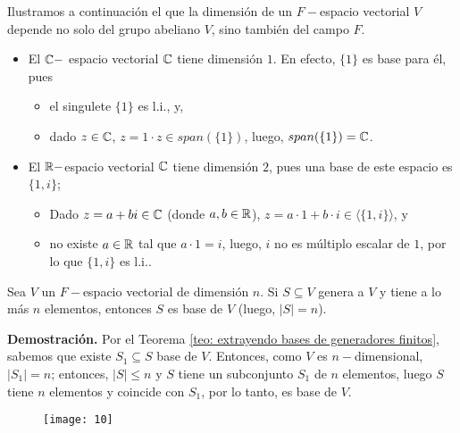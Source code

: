 \begin{ejem}
Ilustramos a continuación el que la dimensión de un
$F-$espacio vectorial $V$ depende no solo del grupo abeliano $V$,
sino también del campo $F$.
\begin{itemize}
	\item El $\mathbb{C}-$ espacio vectorial $\mathbb{C}$ tiene dimensión $1$.
	En efecto, $\{ 1 \}$ es base para él, pues
	\begin{itemize}
		\item el singulete $\{ 1 \}$ es l.i., y,
		\item dado $z \in \mathbb{C}$, $z = 1 \cdot z \in span(\{ 1 \}) $,
		luego, $span(\{ 1 \}) = \mathbb{C}$.
	\end{itemize}
	\item El $\mathbb{R}-$espacio vectorial $\mathbb{C}$ tiene dimensión $2$,
	pues una base de este espacio es $\{ 1, i \}$;
	\begin{itemize}
		\item Dado $z = a + b i \in \mathbb{C}$ (donde $a, b \in \mathbb{R}$),
		$z = a \cdot 1 + b \cdot i \in \langle \{ 1, i \} \rangle$, y
		\item no existe $a \in \mathbb{R}$ tal que $a \cdot 1 = i$, luego,
		$i$ no es múltiplo escalar de $1$, por lo que 
		$\{ 1, i \}$ es l.i..
	\end{itemize}
\end{itemize}
\end{ejem}

\begin{cor}
	\label{cor: generador de n elementos es base en un n dim}
Sea $V$ un $F-$espacio vectorial de dimensión $n$. Si
$S \subseteq V$ genera a $V$ y tiene a lo más $n$ elementos, entonces $S$
es base de $V$ (luego, $|S| = n$).
\end{cor}
\noindent
\textbf{Demostración.}
Por el Teorema 
\ref{teo: extrayendo bases de generadores finitos}, 
sabemos que existe $S_{1} \subseteq S$ base de $V$.
Entonces, como $V$ es $n-$dimensional,
$|S_{1}| = n$; entonces, $|S| \leq n$ y $S$ tiene 
un subconjunto $S_{1}$ de $n$ elementos, luego $S$ tiene $n$
elementos y coincide con $S_{1}$, 
por lo tanto, es base de $V$.
\QEDB
\vspace{0.2cm}

\begin{figure}[H]
	\centering
	\texttt{[image: 10]} 
\end{figure}	

